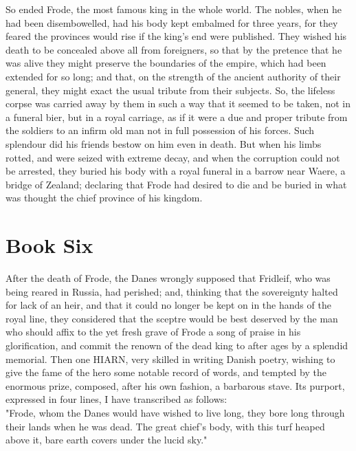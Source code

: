 \documentclass[10pt,a4paper]{report}
\begin{document}
So ended Frode, the most famous king in the whole world. The nobles, when he had been disembowelled, had his body kept embalmed for three years, for they feared the provinces would rise if the king's end were published. They wished his death to be concealed above all from foreigners, so that by the pretence that he was alive they might preserve the boundaries of the empire, which had been extended for so long; and that, on the strength of the ancient authority of their general, they might exact the usual tribute from their subjects. So, the lifeless corpse was carried away by them in such a way that it seemed to be taken, not in a funeral bier, but in a royal carriage, as if it were a due and proper tribute from the soldiers to an infirm old man not in full possession of his forces. Such splendour did his friends bestow on him even in death. But when his limbs rotted, and were seized with extreme decay, and when the corruption could not be arrested, they buried his body with a royal funeral in a barrow near Waere, a bridge of Zealand; declaring that Frode had desired to die and be buried in what was thought the chief province of his kingdom.\\

\chapter{Book Six}

After the death of Frode, the Danes wrongly supposed that Fridleif, who was being reared in Russia, had perished; and, thinking that the sovereignty halted for lack of an heir, and that it could no longer be kept on in the hands of the royal line, they considered that the sceptre would be best deserved by the man who should affix to the yet fresh grave of Frode a song of praise in his glorification, and commit the renown of the dead king to after ages by a splendid memorial. Then one HIARN, very skilled in writing Danish poetry, wishing to give the fame of the hero some notable record of words, and tempted by the enormous prize, composed, after his own fashion, a barbarous stave. Its purport, expressed in four lines, I have transcribed as follows:\\

"Frode, whom the Danes would have wished to live long, they bore long through their lands when he was dead. The great chief's body, with this turf heaped above it, bare earth covers under the lucid sky."\\
\end{document}
